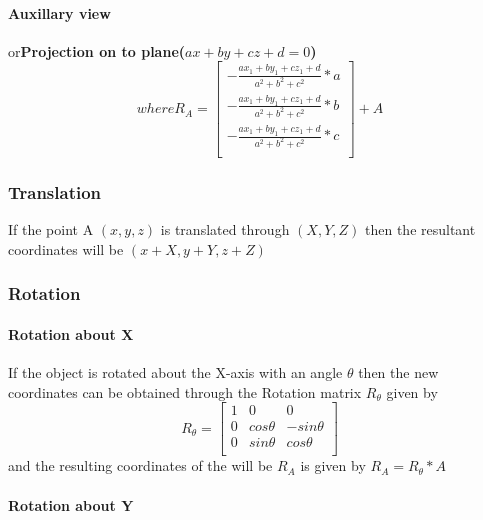 \documentclass{article}
\begin{document}
\paragraph{Auxillary view} or\hspace{3mm}\textbf{Projection on to plane($ax+by+cz+d=0$)}
 \\

\begin{equation} where
R_{A} =
\left[\begin{matrix}
-\frac{ax_{1}+by_{1}+cz_{1}+d} {a^2+b^2+c^2} *a\\
-\frac{ax_{1}+by_{1}+cz_{1}+d} {a^2+b^2+c^2} *b\\
-\frac{ax_{1}+by_{1}+cz_{1}+d} {a^2+b^2+c^2} *c\\
\end{matrix}\right]
+
A
\end{equation}


\subsubsection{Translation}
  If the point A $(x,y,z)$ is translated through $(X,Y,Z)$ then the resultant coordinates will be $(x+X,y+Y,z+Z)$
 
 
\subsubsection{Rotation}

\paragraph{Rotation about X}

If the object is rotated about the X-axis with an angle $\theta$ then the new coordinates can be obtained through the Rotation matrix $R_{\theta}$ given by
\begin{equation}
R_{\theta} =
\left[\begin{matrix}
1&0&0\\0&cos\theta&-sin\theta\\0&sin\theta&cos\theta\\
\end{matrix}\right]
\end{equation}
and the resulting coordinates of the will be $R_{A}$ is given by
$R_{A} = R_{\theta}*A$

\paragraph{Rotation about Y}
\end{document}
